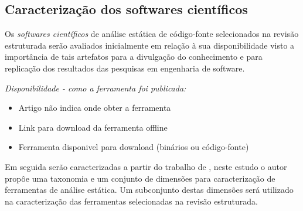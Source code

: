 
\subsection{Caracterização dos softwares científicos}
\label{caracterizacao}

Os {\it softwares científicos} de análise estática de código-fonte selecionados
na revisão estruturada serão avaliados inicialmente em relação à sua
disponibilidade visto a importância de tais artefatos para a divulgação do
conhecimento e para replicação dos resultados das pesquisas em engenharia de
software.


\begin{description}

  \item {\it Disponibilidade - como a ferramenta foi publicada:}
    \begin{itemize}
      \item Artigo não indica onde obter a ferramenta
      \item Link para download da ferramenta offline
      \item Ferramenta disponivel para download (binários ou código-fonte)
    \end{itemize}

\end{description}

Em seguida serão caracterizadas a partir do trabalho de ,
neste estudo o autor propôe uma taxonomia e um conjunto de dimensões para
caracterização de ferramentas de análise estática. Um subconjunto destas
dimensões será utilizado na caracterização das ferramentas selecionadas
na revisão estruturada.

